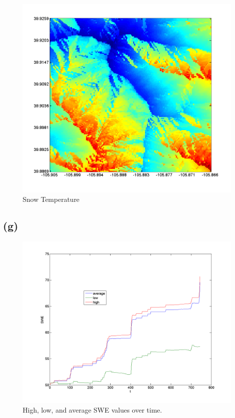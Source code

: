 \documentclass[fleqn, letterpaper]{tufte-handout}
\begin{document}
\begin{figure}
	\includegraphics[width=\textwidth]{tsnow}
	\caption{Snow Temperature}
	\label{tsnow}
\end{figure}
\subsection{(g)}
\begin{figure}
	\includegraphics[width=\textwidth]{graph}
	\caption{High, low, and average SWE values over time.}

\end{figure}
\end{document}
